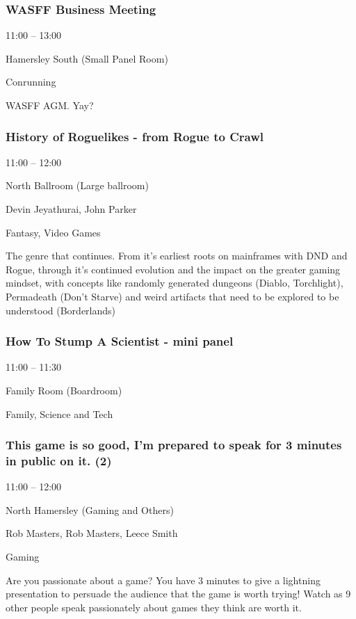 \documentclass{scrreprt}
\begin{document}
\begin{multicols}{2}
\subsubsection*{WASFF Business Meeting}\begin{description}
\setlength{\itemsep}{0pt}
\setlength{\parsep}{0pt}
\setlength{\parskip}{0pt}
\item[Time:]{11:00 -- 13:00}
\item[Venue:]{Hamersley South (Small Panel Room)}
\item[Tags:]{Conrunning}\end{description}
WASFF AGM. Yay?
\subsubsection*{History of Roguelikes - from Rogue to Crawl}\begin{description}
\setlength{\itemsep}{0pt}
\setlength{\parsep}{0pt}
\setlength{\parskip}{0pt}
\item[Time:]{11:00 -- 12:00}
\item[Venue:]{North Ballroom (Large ballroom)}
\item[People:]{Devin Jeyathurai, John Parker}
\item[Tags:]{Fantasy, Video Games}\end{description}
The genre that continues. From it's earliest roots on mainframes with DND and Rogue, through it's continued evolution and the impact on the greater gaming mindset, with concepts like randomly generated dungeons (Diablo, Torchlight), Permadeath (Don't Starve) and weird artifacts that need to be explored to be understood (Borderlands)
\subsubsection*{How To Stump A Scientist - mini panel}\begin{description}
\setlength{\itemsep}{0pt}
\setlength{\parsep}{0pt}
\setlength{\parskip}{0pt}
\item[Time:]{11:00 -- 11:30}
\item[Venue:]{Family Room (Boardroom)}
\item[Tags:]{Family, Science and Tech}\end{description}

\subsubsection*{This game is so good, I'm prepared to speak for 3 minutes in public on it. (2)}\begin{description}
\setlength{\itemsep}{0pt}
\setlength{\parsep}{0pt}
\setlength{\parskip}{0pt}
\item[Time:]{11:00 -- 12:00}
\item[Venue:]{North Hamersley (Gaming and Others)}
\item[People:]{Rob Masters, Rob Masters, Leece Smith}
\item[Tags:]{Gaming}\end{description}
Are you passionate about a game? You have 3 minutes to give a lightning presentation to persuade the audience that the game is worth trying! Watch as 9 other people speak passionately about games they think are worth it.

\end{multicols}
\end{document}
